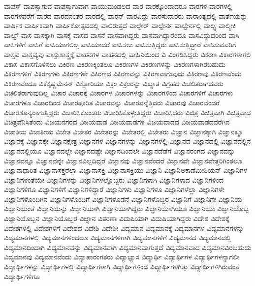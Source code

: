 {ವಾಪಸ್
ವಾಪಸ್ಸಾಗುವ
ವಾಪಸ್ಸಾಗುವಾಗ
ವಾಯುಮಂಡಲದ
ವಾರ
ವಾರಕ್ಕೊಂದಾದರೂ
ವಾರಗಳ
ವಾರಗಳಲ್ಲಿ
ವಾರಗಳವರೆಗೆ
ವಾರದ
ವಾರದನಂತರ
ವಾರದಲ್ಲಿ
ವಾರನ್
ವಾರವಿದ್ದು
ವಾರಸುದಾರರು
ವಾರಾಂತ್ಯದಲ್ಲಿ
ವಾರ್ತೆಯನ್ನು
ವಾರ್ಷಿಕ
ವಾರ್ಷಿಕವಾಗಿ
ವಾರ್ಷಿಕೋತ್ಸವದಲ್ಲಿ
ವಾಲಿರುತ್ತದೆ
ವಾಲ್ಟೇರ್
ವಾಲ್ಟೇರ್ನ
ವಾಲ್ಟೇರ್ನಲ್ಲಿ
ವಾಲ್ಟ್ನ
ವಾಲ್ಮೀಕಿ
ವಾಲ್ವ್
ವಾಸ
ವಾಸಕ್ಕಾಗಿ
ವಾಸಕ್ಕೆ
ವಾಸದ
ವಾಸನೆ
ವಾಸವಾಗಿದ್ದರು
ವಾಸವಾಗಿದ್ದಾರೆಂದೂ
ವಾಸವಿದ್ದುದರಿಂದ
ವಾಸಿ
ವಾಸಿಗಳಿಗೆ
ವಾಸಿಗೆ
ವಾಸಿಯಾಗಲಿಲ್ಲ
ವಾಸಿಯಾದರೆ
ವಾಸಿಸಲು
ವಾಸಿಸುತ್ತಿದ್ದರು
ವಾಸಿಸುತ್ತಿದ್ದಾರೆ
ವಾಸಿಸುವವರಿಗೆ
ವಾಸ್ತವ
ವಾಸ್ತವ್ಯವು
ವಾಸ್ತುಶಾಸ್ತ್ರಕ್ಕೆ
ವಾಹನಗಳ
ವಾಹನದಲ್ಲಿ
ವಾಹಿನಿಯಿಂದ
ವಿ
ವಿಂಗಡಿಸಿದ್ದರು
ವಿಕರಣ
ವಿಕಾರಗಳಾಗಲಿ
ವಿಕಾಸ
ವಿಕಾಸಗೊಳಿಸಲು
ವಿಕಿರಣ
ವಿಕಿರಣಕ್ಕಿಂತಲೂ
ವಿಕಿರಣಗಳ
ವಿಕಿರಣಗಳನ್ನು
ವಿಕಿರಣಗಳಾಗಿರಬಹುದು
ವಿಕಿರಣಗಳಿಗೆ
ವಿಕಿರಣಗಳು
ವಿಕಿರಣಗಳೇ
ವಿಕಿರಣದ
ವಿಕಿರಣವನ್ನು
ವಿಕಿರಣವಾಗುವುದು
ವಿಕಿರಣವು
ವಿಕಿರಣವೆಂದು
ವಿಕಿರಣವೆಂದೂ
ವಿಕೆಕೃಷ್ಣಮೆನನ್
ವಿಕ್ಟೋರಿಯಾ
ವಿಕ್ರಂ
ವಿಕ್ರಂರನ್ನು
ವಿಖ್ಯಾತ
ವಿಗ್ರಹದ
ವಿಚಲಿತರಾಗದವರು
ವಿಚಲಿತರಾಗುವುದಿಲ್ಲ
ವಿಚಾರ
ವಿಚಾರಕ್ಕೆ
ವಿಚಾರಗಳ
ವಿಚಾರಗಳನ್ನು
ವಿಚಾರಗಳಿಂದ
ವಿಚಾರಗಳಿಗೆ
ವಿಚಾರಗಳು
ವಿಚಾರಗಳೂ
ವಿಚಾರದಿಂದ
ವಿಚಾರಪೂರಿತ
ವಿಚಾರವನ್ನು
ವಿಚಾರವನ್ನೆತ್ತಿದರು
ವಿಚಾರವು
ವಿಚಾರವೆಂದರೆ
ವಿಚಾರಶೂನ್ಯರಾಗುತ್ತಿದ್ದರು
ವಿಚಾರಿಸಿಕೊಂಡರು
ವಿಚಾರಿಸಿಕೊಳ್ಳುತಿದ್ದರು
ವಿಚಾರಿಸಿದರು
ವಿಚಿತ್ರ
ವಿಚಿತ್ರವಾಗಿ
ವಿಚಿತ್ರವಾದ
ವಿಚಿತ್ರವೆನಿಸಿತೆಂದು
ವಿಜಯನಗರದ
ವಿಜಯವಾಡ
ವಿಜಯವಾಡಗಳ
ವಿಜಯವಾಡದ
ವಿಜಯವಾಡದವರೆಗಿನ
ವಿಜಾತಿಯ
ವಿಜಾತೀಯ
ವಿಜೇತ
ವಿಜೇತರ
ವಿಜೇತರನ್ನು
ವಿಜೇತರಲ್ಲಿ
ವಿಜೇತರು
ವಿಜ್ಞಾನ
ವಿಜ್ಞಾನಕ್ಕಾಗಿ
ವಿಜ್ಞಾನಕ್ಕೂ
ವಿಜ್ಞಾನಕ್ಕೆ
ವಿಜ್ಞಾನಕ್ಕೇ
ವಿಜ್ಞಾನಕ್ಷೇತ್ರ
ವಿಜ್ಞಾನಗಳ
ವಿಜ್ಞಾನಗಳನ್ನು
ವಿಜ್ಞಾನಗಳಲ್ಲಿ
ವಿಜ್ಞಾನದ
ವಿಜ್ಞಾನದಲ್ಲಿ
ವಿಜ್ಞಾನದಲ್ಲಿನ
ವಿಜ್ಞಾನದಲ್ಲಿಯೂ
ವಿಜ್ಞಾನದಲ್ಲೇ
ವಿಜ್ಞಾನದಷ್ಟೇ
ವಿಜ್ಞಾನದಿಂದಲೇ
ವಿಜ್ಞಾನದೆಡೆಗೆ
ವಿಜ್ಞಾನರಂಗದ
ವಿಜ್ಞಾನವನ್ನು
ವಿಜ್ಞಾನವನ್ನೂ
ವಿಜ್ಞಾನವನ್ನೇ
ವಿಜ್ಞಾನವಿಲ್ಲದಿದ್ದರೆ
ವಿಜ್ಞಾನವು
ವಿಜ್ಞಾನವೆಂದರೆ
ವಿಜ್ಞಾನವೇ
ವಿಜ್ಞಾನವೇತ್ತರಿಗಿಂತಲೂ
ವಿಜ್ಞಾನಾಧಾರಿತ
ವಿಜ್ಞಾನಾಸಕ್ತರೆಲ್ಲಾ
ವಿಜ್ಞಾನಾಸಕ್ತಿ
ವಿಜ್ಞಾನಾಸಕ್ತಿಯು
ವಿಜ್ಞಾನಿ
ವಿಜ್ಞಾನಿಅಕಾಡೆಮೀಶಿಯನ್
ವಿಜ್ಞಾನಿಗಳ
ವಿಜ್ಞಾನಿಗಳಂತೆಯೇ
ವಿಜ್ಞಾನಿಗಳನ್ನು
ವಿಜ್ಞಾನಿಗಳಲ್ಲೊಬ್ಬರು
ವಿಜ್ಞಾನಿಗಳಾಗಿ
ವಿಜ್ಞಾನಿಗಳಾದ
ವಿಜ್ಞಾನಿಗಳಿಂದ
ವಿಜ್ಞಾನಿಗಳಿಗೂ
ವಿಜ್ಞಾನಿಗಳಿಗೆ
ವಿಜ್ಞಾನಿಗಳಿದ್ದಾರೆ
ವಿಜ್ಞಾನಿಗಳು
ವಿಜ್ಞಾನಿಗಳೂ
ವಿಜ್ಞಾನಿಗಳೆಲ್ಲಾ
ವಿಜ್ಞಾನಿಗಳೇ
ವಿಜ್ಞಾನಿಗಳೊಂದಿಗಿನ
ವಿಜ್ಞಾನಿಗಳೊಂದಿಗೆ
ವಿಜ್ಞಾನಿಗಳೊಡನೆ
ವಿಜ್ಞಾನಿಗಳೊಬ್ಬರ
ವಿಜ್ಞಾನಿಗೆ
ವಿಜ್ಞಾನಿಗೇ
ವಿಜ್ಞಾನಿಯ
ವಿಜ್ಞಾನಿಯಂತೆ
ವಿಜ್ಞಾನಿಯನ್ನು
ವಿಜ್ಞಾನಿಯಾಗಿ
ವಿಜ್ಞಾನಿಯಾಗಿದ್ದರು
ವಿಜ್ಞಾನಿಯಾಗಿಯೂ
ವಿಜ್ಞಾನಿಯು
ವಿಜ್ಞಾನಿಯೊಬ್ಬ
ವಿಜ್ಞಾನಿಯೊಬ್ಬನ
ವಿಜ್ಞಾನಿಯೊಬ್ಬರ
ವಿಜ್ನಾನ
ವಿತರಣಾ
ವಿದುಷಿಯಾಗಿ
ವಿದುಷಿಯಾಗಿದ್ದರು
ವಿದೇಶ
ವಿದೇಶಕ್ಕೆ
ವಿದೇಶಗಳಲ್ಲಿ
ವಿದೇಶಗಳಿಗೆ
ವಿದೇಶದ
ವಿದೇಶಿ
ವಿದೇಶೀ
ವಿದ್ಯಮಾನ
ವಿದ್ಯಮಾನಕ್ಕೆ
ವಿದ್ಯಮಾನಗಳ
ವಿದ್ಯಮಾನಗಳನ್ನು
ವಿದ್ಯಮಾನಗಳಲ್ಲಿ
ವಿದ್ಯಮಾನಗಳಿಂದಲೂ
ವಿದ್ಯಮಾನಗಳಿಗಾಗಿ
ವಿದ್ಯಮಾನಗಳಿಗೆ
ವಿದ್ಯಮಾನದ
ವಿದ್ಯಮಾನದಲ್ಲಿ
ವಿದ್ಯಮಾನದಿಂದಾಗಿ
ವಿದ್ಯಮಾನವನ್ನು
ವಿದ್ಯಮಾನವಾಗಿ
ವಿದ್ಯಮಾನವಾಗುತ್ತದೆ
ವಿದ್ಯಮಾನವಾದ
ವಿದ್ಯಮಾನವಿರಬಹುದು
ವಿದ್ಯಮಾನವು
ವಿದ್ಯಮಾನವೆಂದು
ವಿದ್ಯಾಪಾರಂಗತರು
ವಿದ್ಯಾಭ್ಯಾಸ
ವಿದ್ಯಾರ್ಥಿ
ವಿದ್ಯಾರ್ಥಿಗಳ
ವಿದ್ಯಾರ್ಥಿಗಳನ್ನಾಗಲೀ
ವಿದ್ಯಾರ್ಥಿಗಳನ್ನು
ವಿದ್ಯಾರ್ಥಿಗಳಲ್ಲಿ
ವಿದ್ಯಾರ್ಥಿಗಳಾಗಿ
ವಿದ್ಯಾರ್ಥಿಗಳಿಂದ
ವಿದ್ಯಾರ್ಥಿಗಳಿಗಿತ್ತು
ವಿದ್ಯಾರ್ಥಿಗಳಿಗಿರುವಂತೆ
ವಿದ್ಯಾರ್ಥಿಗಳಿಗೂ
}
